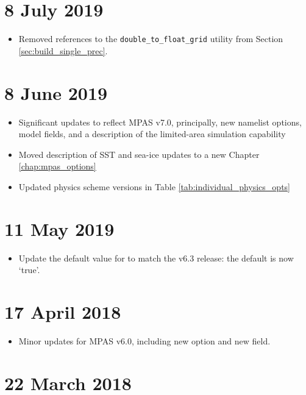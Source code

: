 \section*{8 July 2019}

\begin{itemize}
\item Removed references to the {\tt double\_to\_float\_grid} utility from Section \ref{sec:build_single_prec}.
\end{itemize}

\section*{8 June 2019}

\begin{itemize}
\item Significant updates to reflect MPAS v7.0, principally, new namelist options, model fields, and a description of the
limited-area simulation capability
\item Moved description of SST and sea-ice updates to a new Chapter \ref{chap:mpas_options}
\item Updated physics scheme versions in Table \ref{tab:individual_physics_opts}
\end{itemize}

\section*{11 May 2019}

\begin{itemize}
\item Update the default value for  to match the v6.3 release: the default is now `true'.
\end{itemize}

\section*{17 April 2018}

\begin{itemize}
\item Minor updates for MPAS v6.0, including new  option and new  field.
\end{itemize}

\section*{22 March 2018}

